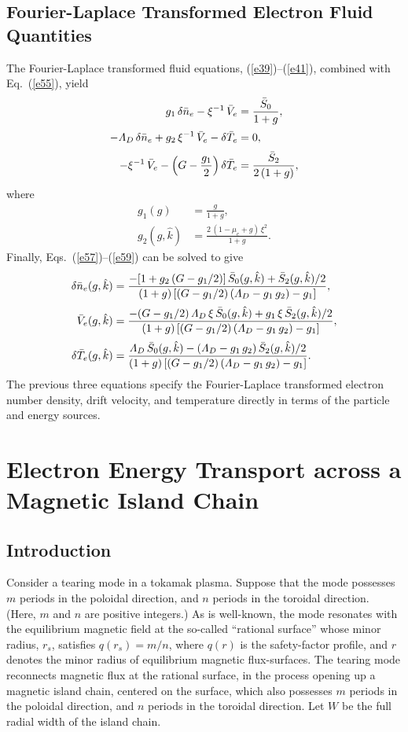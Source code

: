 \documentclass[12pt,prb,aps]{revtex4-1}
\begin{document}
\subsection{Fourier-Laplace Transformed Electron Fluid Quantities}
The Fourier-Laplace transformed fluid equations, (\ref{e39})--(\ref{e41}), combined with Eq.~(\ref{e55}), yield
\begin{align}\label{e57}
g_1\,\delta\bar{n}_e-\xi^{-1}\,\bar{V}_e&= \frac{\bar{S}_0}{1+g},\\[0.5ex]
-{\mit\Lambda}_D\,\delta\bar{n}_e+g_2\,\xi^{-1}\,\bar{V}_e-\delta\bar{T}_e&=0,\\[0.5ex]
-\xi^{-1}\,\bar{V}_e-\left(G-\frac{g_1}{2}\right)\delta\bar{T}_e&= \frac{\bar{S}_2}{2\,(1+g)},\label{e59}
\end{align}
where
\begin{align}
g_1(g)&= \frac{g}{1+g},\\[0.5ex]
g_2(g,\hat{k})&=\frac{2\,(1-\mu_e+g)\,\xi^2}{1+g}.
\end{align}
Finally, Eqs.~(\ref{e57})--(\ref{e59})  can be solved to give\,\cite{haz}
\begin{align}\label{e67}
\delta\bar{n}_e(g,\hat{k})&=  \frac{-[1+g_2\,(G-g_1/2)]\,\bar{S}_0(g,\hat{k})+\bar{S}_2(g,\hat{k})/2}{(1+g)\,[(G-g_1/2)\,({\mit\Lambda}_D-g_1\,g_2)-g_1]},\\[0.5ex]
\bar{V}_e(g,\hat{k}) &=\frac{-(G-g_1/2)\,{\mit\Lambda}_D\,\xi\,\bar{S}_0(g,\hat{k})+g_1\,\xi\,\bar{S}_2(g,\hat{k})/2}{(1+g)\,[(G-g_1/2)\,({\mit\Lambda}_D-g_1\,g_2)-g_1]},\\[0.5ex]
\delta\bar{T}_e(g,\hat{k})&= \frac{{\mit\Lambda}_D\,\bar{S}_0(g,\hat{k})-({\mit\Lambda}_D-g_1\,g_2)\,\bar{S}_2(g,\hat{k})/2}{(1+g)\,[(G-g_1/2)\,({\mit\Lambda}_D-g_1\,g_2)-g_1]}.\label{e69}
\end{align}
The previous three equations specify the Fourier-Laplace transformed electron number density, drift velocity, and temperature
directly in terms of the particle and energy sources. 

\section{Electron Energy Transport across a Magnetic Island Chain}

\subsection{Introduction}
Consider a tearing mode  in a tokamak plasma.\cite{fkr,fitz} Suppose that the mode possesses $m$ periods in the poloidal direction, and $n$ periods in the toroidal direction. 
(Here, $m$ and $n$ are positive integers.) As is well-known, the
mode resonates with the equilibrium magnetic field at the so-called ``rational surface'' whose minor radius, $r_s$, satisfies $q(r_s)=m/n$, where $q(r)$ is the
safety-factor profile, and $r$ denotes the minor radius of equilibrium magnetic flux-surfaces.\cite{wesson,fitz} The tearing mode reconnects magnetic flux at the rational surface, in the process opening up a magnetic island chain, centered on the surface,  which also possesses $m$ periods in the poloidal direction, and $n$ periods in the toroidal direction.\cite{ruth}  Let $W$ be the full radial width of the island chain. 
\end{document}
